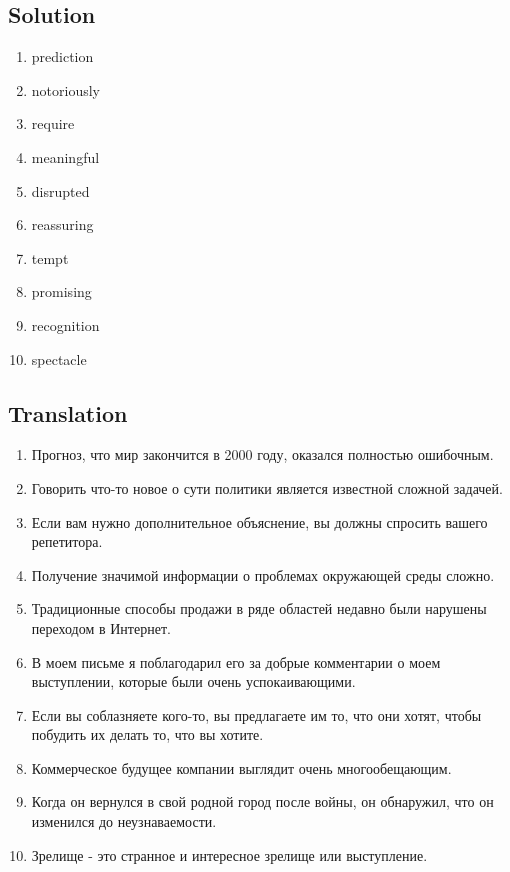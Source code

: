 \subsection*{Solution}
\begin{enumerate}
      \item prediction
      \item notoriously
      \item require
      \item meaningful
      \item disrupted
      \item reassuring
      \item tempt
      \item promising
      \item recognition
      \item spectacle
\end{enumerate}

\subsection*{Translation}
\begin{enumerate}
      \item Прогноз, что мир закончится в 2000 году, оказался полностью ошибочным.
      \item Говорить что-то новое о сути политики является известной сложной задачей.
      \item Если вам нужно дополнительное объяснение, вы должны спросить вашего репетитора.
      \item Получение значимой информации о проблемах окружающей среды сложно.
      \item Традиционные способы продажи в ряде областей недавно были нарушены переходом в Интернет.
      \item В моем письме я поблагодарил его за добрые комментарии о моем выступлении, которые были очень успокаивающими.
      \item Если вы соблазняете кого-то, вы предлагаете им то, что они хотят, чтобы побудить их делать то, что вы хотите.
      \item Коммерческое будущее компании выглядит очень многообещающим.
      \item Когда он вернулся в свой родной город после войны, он обнаружил, что он изменился до неузнаваемости.
      \item Зрелище - это странное и интересное зрелище или выступление.
\end{enumerate}

